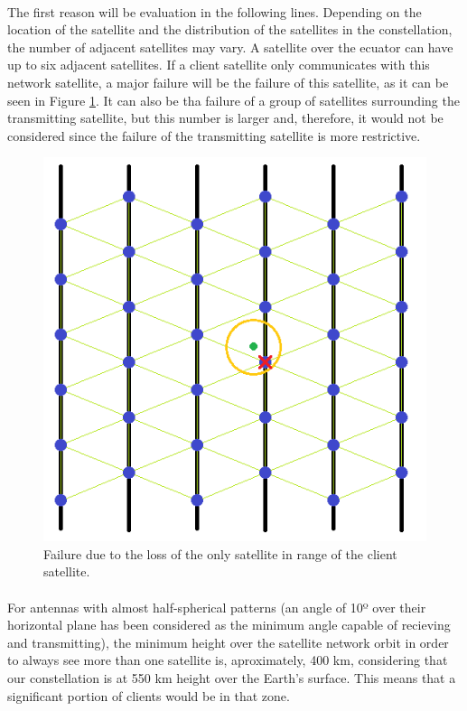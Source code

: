 \documentclass[12pt,a4paper]{report}
\begin{document}
\paragraph{}The first reason will be evaluation in the following lines. Depending on the location of the satellite and the distribution of the satellites in the constellation, the number of adjacent satellites may vary. A satellite over the ecuator can have up to six adjacent satellites. If a client satellite only communicates with this network satellite, a major failure will be the failure of this satellite, as it can be seen in Figure \ref{fig:critical1}. It can also be tha failure of a group of satellites surrounding the transmitting satellite, but this number is larger and, therefore, it would not be considered since the failure of the transmitting satellite is more restrictive.
\begin{figure}[H]
\begin{center}
\includegraphics[scale=0.5]{critical1.PNG}
\caption[1 communication range failure]{Failure due to the loss of the only satellite in range of the client satellite.}
\label{fig:critical1}
\end{center}
\end{figure}
\paragraph{}For antennas with almost half-spherical patterns (an angle of 10º over their horizontal plane has been considered as the minimum angle capable of recieving and transmitting), the minimum height over the satellite network orbit in order to always see more than one satellite is, aproximately, 400 km, considering that our constellation is at 550 km height over the Earth's surface. This means that a significant portion of clients would be in that zone.
\end{document}
